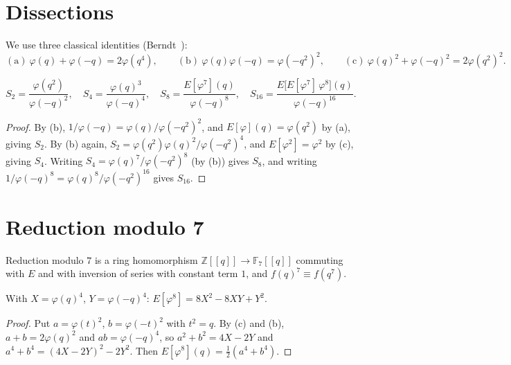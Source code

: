 \documentclass[11pt]{article}
\theoremstyle{remark}\newtheorem{remark}[theorem]{Remark}
\begin{document}
\section{Dissections}
We use three classical identities (Berndt~\cite[Ch.~16, Entry 25]{Berndt}):
\[(\mathrm a)\ \varphi(q)+\varphi(-q)=2\varphi(q^4),\qquad(\mathrm b)\ \varphi(q)\varphi(-q)=\varphi(-q^2)^2,\qquad(\mathrm c)\ \varphi(q)^2+\varphi(-q)^2=2\varphi(q^2)^2.\]
\begin{lemma}\label{lem:dis}
\[S_2=\frac{\varphi(q^2)}{\varphi(-q)^2},\quad S_4=\frac{\varphi(q)^3}{\varphi(-q)^4},\quad S_8=\frac{E[\varphi^7](q)}{\varphi(-q)^8},\quad S_{16}=\frac{E\big[E[\varphi^7]\,\varphi^8\big](q)}{\varphi(-q)^{16}}.\]
\end{lemma}
\begin{proof} By (b), $1/\varphi(-q)=\varphi(q)/\varphi(-q^2)^2$, and $E[\varphi](q)=\varphi(q^2)$ by (a), giving $S_2$. By (b) again, $S_2=\varphi(q^2)\varphi(q)^2/\varphi(-q^2)^4$, and $E[\varphi^2]=\varphi^2$ by (c), giving $S_4$. Writing $S_4=\varphi(q)^7/\varphi(-q^2)^8$ (by (b)) gives $S_8$, and writing $1/\varphi(-q)^8=\varphi(q)^8/\varphi(-q^2)^{16}$ gives $S_{16}$.\end{proof}

\section{Reduction modulo 7}
Reduction modulo $7$ is a ring homomorphism $\mathbb Z[[q]]\to\mathbb F_7[[q]]$ commuting with $E$ and with inversion of series with constant term $1$, and $f(q)^7\equiv f(q^7)$.

\begin{lemma}\label{lem:E8} With $X=\varphi(q)^4$, $Y=\varphi(-q)^4$: $E[\varphi^8]=8X^2-8XY+Y^2$.\end{lemma}
\begin{proof} Put $a=\varphi(t)^2$, $b=\varphi(-t)^2$ with $t^2=q$. By (c) and (b), $a+b=2\varphi(q)^2$ and $ab=\varphi(-q)^4$, so $a^2+b^2=4X-2Y$ and $a^4+b^4=(4X-2Y)^2-2Y^2$. Then $E[\varphi^8](q)=\frac12(a^4+b^4)$.\end{proof}
\end{document}
